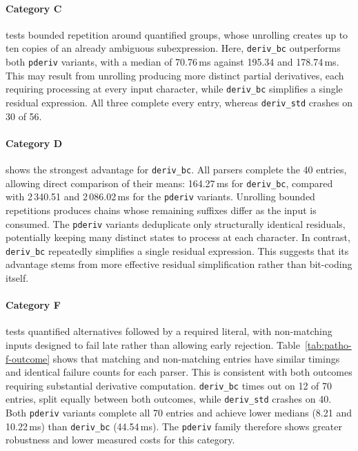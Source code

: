 \paragraph{Category C}
tests bounded repetition around quantified groups,
whose unrolling creates up to ten copies of
an already ambiguous subexpression.
Here, \texttt{deriv\_bc} outperforms both
\texttt{pderiv} variants, with a median of
70.76\,ms against 195.34 and 178.74\,ms.
This may result from unrolling producing more
distinct partial derivatives, each requiring
processing at every input character, while
\texttt{deriv\_bc} simplifies a single residual expression.
All three complete every entry, whereas
\texttt{deriv\_std} crashes on 30 of 56.

\paragraph{Category D}
shows the strongest advantage for \texttt{deriv\_bc}.
All parsers complete the 40 entries, allowing
direct comparison of their means:
164.27\,ms for \texttt{deriv\_bc}, compared with
2\,340.51 and 2\,086.02\,ms for the \texttt{pderiv} variants.
Unrolling bounded repetitions produces chains whose
remaining suffixes differ as the input is consumed.
The \texttt{pderiv} variants deduplicate only
structurally identical residuals, potentially keeping
many distinct states to process at each character.
In contrast, \texttt{deriv\_bc} repeatedly simplifies
a single residual expression.
This suggests that its advantage stems from
more effective residual simplification
rather than bit-coding itself.

\paragraph{Category F}
tests quantified alternatives followed by a
required literal, with non-matching inputs designed
to fail late rather than allowing early rejection.
Table~\ref{tab:patho-f-outcome} shows that matching
and non-matching entries have similar timings
and identical failure counts for each parser.
This is consistent with both outcomes requiring
substantial derivative computation.
\texttt{deriv\_bc} times out on 12 of 70 entries,
split equally between both outcomes,
while \texttt{deriv\_std} crashes on 40.
Both \texttt{pderiv} variants complete all 70 entries
and achieve lower medians (8.21 and 10.22\,ms)
than \texttt{deriv\_bc} (44.54\,ms).
The \texttt{pderiv} family therefore shows
greater robustness and lower measured costs
for this category.

